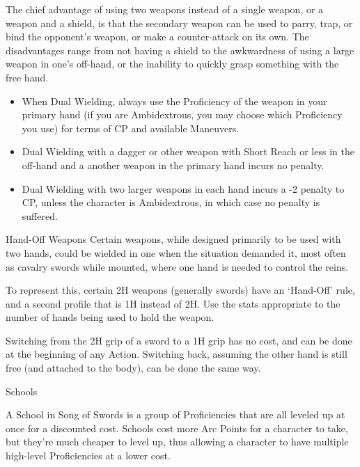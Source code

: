 \documentclass[oneside,11pt,english]{book}
\begin{document}
 

The chief advantage of using two weapons instead of a single weapon, or a weapon and a shield, is that 
the secondary weapon can be used to parry, trap, or bind the opponent’s weapon, or make a counter-attack 
on its own. The disadvantages range from not having a shield to the awkwardness of using a large weapon 
in one’s off-hand, or the inability to quickly grasp something with the free hand. 
\begin{itemize}
\item When Dual Wielding, always use the Proficiency of the weapon in your primary hand (if you are 
Ambidextrous, you may choose which Proficiency you use) for terms of CP and available 
Maneuvers. 
\item Dual Wielding with a dagger or other weapon with Short Reach or less in the off-hand and a 
another weapon in the primary hand incurs no penalty. 
\item Dual Wielding with two larger weapons in each hand incurs a -2 penalty to CP, unless the 
character is Ambidextrous, in which case no penalty is suffered. 
\end{itemize}
 

Hand-Off Weapons 
Certain weapons, while designed primarily to be used with two hands, could be wielded in one when the 
situation demanded it, most often as cavalry swords while mounted, where one hand is needed to control 
the reins. 

 

To represent this, certain 2H weapons (generally swords) have an ‘Hand-Off’ rule, and a second profile 
that is 1H instead of 2H. Use the stats appropriate to the number of hands being used to hold the weapon. 

 

Switching from the 2H grip of a sword to a 1H grip has no cost, and can be done at the beginning of any 
Action. Switching back, assuming the other hand is still free (and attached to the body), can be done the 
same way. 

 


Schools 

 

A School in Song of Swords is a group of Proficiencies that are all leveled up at once for a discounted 
cost. Schools cost more Arc Points for a character to take, but they’re much cheaper to level up, thus 
allowing a character to have multiple high-level Proficiencies at a lower cost. 

 
\end{document}
